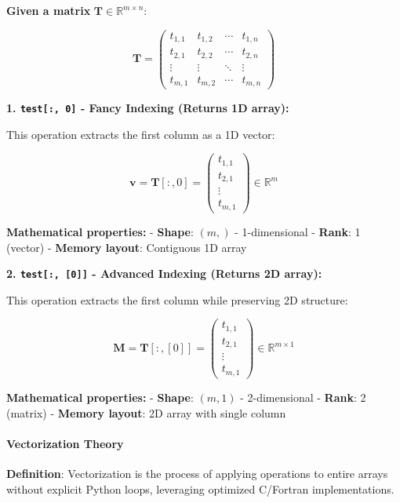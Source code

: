\documentclass[11pt]{article}
\begin{document}
\textbf{Given a matrix} \(\mathbf{T} \in \mathbb{R}^{m \times n}\):

\[\mathbf{T} = \begin{pmatrix} 
t_{1,1} & t_{1,2} & \cdots & t_{1,n} \\
t_{2,1} & t_{2,2} & \cdots & t_{2,n} \\
\vdots & \vdots & \ddots & \vdots \\
t_{m,1} & t_{m,2} & \cdots & t_{m,n}
\end{pmatrix}\]

\textbf{1. \texttt{test{[}:,\ 0{]}} - Fancy Indexing (Returns 1D
array):}

This operation extracts the first column as a 1D vector:

\[\mathbf{v} = \mathbf{T}[:, 0] = \begin{pmatrix} t_{1,1} \\ t_{2,1} \\ \vdots \\ t_{m,1} \end{pmatrix} \in \mathbb{R}^m\]

\textbf{Mathematical properties:} - \textbf{Shape}: \((m,)\) -
1-dimensional - \textbf{Rank}: 1 (vector) - \textbf{Memory layout}:
Contiguous 1D array

\textbf{2. \texttt{test{[}:,\ {[}0{]}{]}} - Advanced Indexing (Returns
2D array):}

This operation extracts the first column while preserving 2D structure:

\[\mathbf{M} = \mathbf{T}[:, [0]] = \begin{pmatrix} t_{1,1} \\ t_{2,1} \\ \vdots \\ t_{m,1} \end{pmatrix} \in \mathbb{R}^{m \times 1}\]

\textbf{Mathematical properties:} - \textbf{Shape}: \((m, 1)\) -
2-dimensional - \textbf{Rank}: 2 (matrix) - \textbf{Memory layout}: 2D
array with single column

\paragraph{Vectorization Theory}\label{vectorization-theory}

\textbf{Definition}: Vectorization is the process of applying operations
to entire arrays without explicit Python loops, leveraging optimized
C/Fortran implementations.
\end{document}
